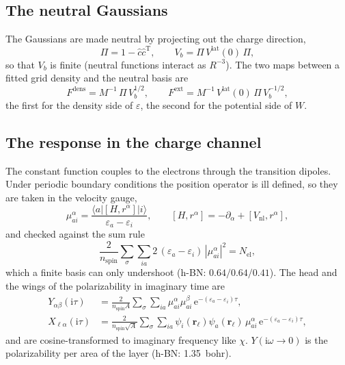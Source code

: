 \documentclass[11pt,a4paper]{article}
\newcommand{\br}{\mathbf{r}}
\newcommand{\ii}{\mathrm{i}}
\newcommand{\ee}{\mathrm{e}}
\newcommand{\Tr}{\mathrm{T}}
\newcommand{\lat}{\mathrm{lat}}
\newcommand{\dens}{\mathrm{dens}}
\newcommand{\ext}{\mathrm{ext}}
\begin{document}
\subsection{The neutral Gaussians}

The Gaussians are made neutral by projecting out the charge direction,
\begin{equation}
  \Pi = 1 - \hat c\hat c^\Tr,\qquad V_b = \Pi\, V^\lat(0)\,\Pi ,
  \label{eq:Pi}
\end{equation}
so that $V_b$ is finite (neutral functions interact as $R^{-3}$). The two maps between a fitted
grid density and the neutral basis are
\begin{equation}
  F^\dens = M^{-1}\,\Pi\, V_b^{1/2},\qquad
  F^\ext = M^{-1}\, V^\lat(0)\,\Pi\, V_b^{-1/2},
  \label{eq:F}
\end{equation}
the first for the density side of $\varepsilon$, the second for the potential side of $W$.

\subsection{The response in the charge channel}

The constant function couples to the electrons through the transition dipoles. Under periodic
boundary conditions the position operator is ill defined, so they are taken in the velocity
gauge,
\begin{equation}
  \mu^\alpha_{ai} = \frac{\langle a|[H,r^\alpha]|i\rangle}{\varepsilon_a-\varepsilon_i},\qquad
  [H,r^\alpha] = -\partial_\alpha + [V_\mathrm{nl},r^\alpha],
  \label{eq:dipole}
\end{equation}
and checked against the sum rule
\begin{equation}
  \frac{2}{n_\mathrm{spin}}\sum_{\sigma}\sum_{ia}2\,(\varepsilon_a-\varepsilon_i)\,|\mu^\alpha_{ai}|^2 = N_\mathrm{el},
  \label{eq:TRK}
\end{equation}
which a finite basis can only undershoot (h-BN: $0.64/0.64/0.41$). The head and the wings of
the polarizability in imaginary time are
\begin{align}
  Y_{\alpha\beta}(\ii\tau) &= \frac{2}{n_\mathrm{spin}A}\sum_\sigma\sum_{ia}\mu^\alpha_{ai}\mu^\beta_{ai}\,\ee^{-(\varepsilon_a-\varepsilon_i)\tau},
  \label{eq:Y}\\
  X_{\ell\alpha}(\ii\tau) &= \frac{2}{n_\mathrm{spin}\sqrt A}\sum_\sigma\sum_{ia}\psi_i(\br_\ell)\psi_a(\br_\ell)\,\mu^\alpha_{ai}\,\ee^{-(\varepsilon_a-\varepsilon_i)\tau},
  \label{eq:X}
\end{align}
and are cosine-transformed to imaginary frequency like $\chi$. $Y(\ii\omega\to0)$ is the
polarizability per area of the layer (h-BN: 1.35~bohr).
\end{document}

